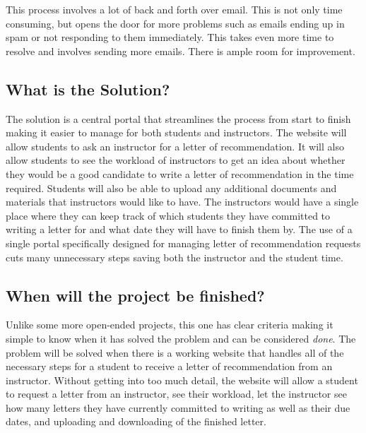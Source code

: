 \documentclass[draftclsnofoot,onecolumn]{IEEEtran}
\begin{document}
This process involves a lot of back and forth over email. This is not only time consuming, but opens the door for more problems such as emails ending up in spam or not responding to them immediately. This takes even more time to resolve and involves sending more emails. There is ample room for improvement.

\subsection{What is the Solution?}
The solution is a central portal that streamlines the process from start to finish making it easier to manage for both students and instructors. The website will allow students to ask an instructor for a letter of recommendation. It will also allow students to see the workload of instructors to get an idea about whether they would be a good candidate to write a letter of recommendation in the time required. Students will also be able to upload any additional documents and materials that instructors would like to have. The instructors would have a single place where they can keep track of which students they have committed to writing a letter for and what date they will have to finish them by. The use of a single portal specifically designed for managing letter of recommendation requests cuts many unnecessary steps saving both the instructor and the student time.

\subsection{When will the project be finished?}
Unlike some more open-ended projects, this one has clear criteria making it simple to know when it has solved the problem and can be considered \textit{done}. The problem will be solved when there is a working website that handles all of the necessary steps for a student to receive a letter of recommendation from an instructor. Without getting into too much detail, the website will allow a student to request a letter from an instructor, see their workload, let the instructor see how many letters they have currently committed to writing as well as their due dates, and uploading and downloading of the finished letter.
\end{document}
